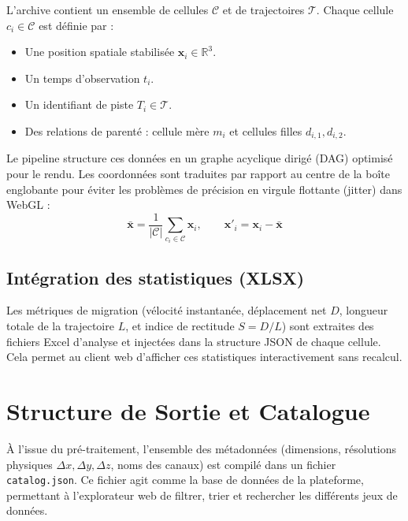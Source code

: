 \documentclass[11pt,a4paper]{article}
\begin{document}
L'archive contient un ensemble de cellules $\mathcal{C}$ et de trajectoires $\mathcal{T}$. Chaque cellule $c_i \in \mathcal{C}$ est définie par :
\begin{itemize}
    \item Une position spatiale stabilisée $\mathbf{x}_i \in \mathbb{R}^3$.
    \item Un temps d'observation $t_i$.
    \item Un identifiant de piste $T_i \in \mathcal{T}$.
    \item Des relations de parenté : cellule mère $m_i$ et cellules filles $d_{i,1}, d_{i,2}$.
\end{itemize}

Le pipeline structure ces données en un graphe acyclique dirigé (DAG) optimisé pour le rendu. Les coordonnées sont traduites par rapport au centre de la boîte englobante pour éviter les problèmes de précision en virgule flottante (jitter) dans WebGL :
\[
\mathbf{\bar{x}} = \frac{1}{|\mathcal{C}|} \sum_{c_i \in \mathcal{C}} \mathbf{x}_i, \qquad \mathbf{x}'_i = \mathbf{x}_i - \mathbf{\bar{x}}
\]

\subsection{Intégration des statistiques (XLSX)}

Les métriques de migration (vélocité instantanée, déplacement net $D$, longueur totale de la trajectoire $L$, et indice de rectitude $S = D/L$) sont extraites des fichiers Excel d'analyse et injectées dans la structure JSON de chaque cellule. Cela permet au client web d'afficher ces statistiques interactivement sans recalcul.

\section{Structure de Sortie et Catalogue}

À l'issue du pré-traitement, l'ensemble des métadonnées (dimensions, résolutions physiques $\Delta x, \Delta y, \Delta z$, noms des canaux) est compilé dans un fichier \texttt{catalog.json}. Ce fichier agit comme la base de données de la plateforme, permettant à l'explorateur web de filtrer, trier et rechercher les différents jeux de données.
\end{document}
